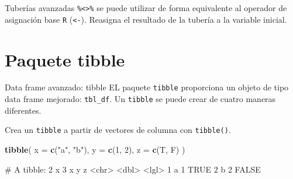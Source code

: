\documentclass[
  ignorenonframetext,
  aspectratio=169]{beamer}
\newenvironment{Shaded}{\begin{snugshade}}{\end{snugshade}}
\newcommand{\AttributeTok}[1]{\textcolor[rgb]{0.13,0.29,0.53}{#1}}
\newcommand{\DecValTok}[1]{\textcolor[rgb]{0.00,0.00,0.81}{#1}}
\newcommand{\FunctionTok}[1]{\textcolor[rgb]{0.13,0.29,0.53}{\textbf{#1}}}
\newcommand{\NormalTok}[1]{#1}
\newcommand{\OtherTok}[1]{\textcolor[rgb]{0.56,0.35,0.01}{#1}}
\newcommand{\SpecialCharTok}[1]{\textcolor[rgb]{0.81,0.36,0.00}{\textbf{#1}}}
\newcommand{\StringTok}[1]{\textcolor[rgb]{0.31,0.60,0.02}{#1}}
\let\oldverbatim\verbatim
\let\endoldverbatim\endverbatim
\renewenvironment{verbatim}{\tiny\oldverbatim}{\endoldverbatim}
\begin{document}
\begin{frame}[fragile]{Tuberías avanzadas}
\label{tuberuxedas-avanzadas-1}
\texttt{\%\textless{}\textgreater{}\%} se puede utilizar de forma
equivalente al operador de asignación base \texttt{R}
(\texttt{\textless{}-}). Reasigna el resultado de la tubería a la
variable inicial.

\begin{Shaded}
\end{Shaded}

\begin{verbatim}
[1] 43.92193
\end{verbatim}
\end{frame}

\section{Paquete tibble}\label{paquete-tibble}

\begin{frame}[fragile]{Data frame avanzado: tibble}
\label{data-frame-avanzado-tibble}
EL paquete \texttt{tibble} proporciona un objeto de tipo data frame
mejorado: \texttt{tbl\_df}. Un \texttt{tibble} se puede crear de cuatro
maneras diferentes.

Crea un \texttt{tibble} a partir de vectores de columna con
\texttt{tibble()}.

\begin{Shaded}
\begin{Highlighting}[]
\FunctionTok{tibble}\NormalTok{(}
  \AttributeTok{x =} \FunctionTok{c}\NormalTok{(}\StringTok{"a"}\NormalTok{, }\StringTok{"b"}\NormalTok{),}
  \AttributeTok{y =} \FunctionTok{c}\NormalTok{(}\DecValTok{1}\NormalTok{, }\DecValTok{2}\NormalTok{),}
  \AttributeTok{z =} \FunctionTok{c}\NormalTok{(T, F)}
\NormalTok{)}
\end{Highlighting}
\end{Shaded}

\begin{verbatim}
# A tibble: 2 x 3
  x         y z    
  <chr> <dbl> <lgl>
1 a         1 TRUE 
2 b         2 FALSE
\end{verbatim}
\end{frame}
\end{document}
